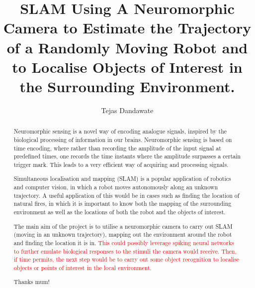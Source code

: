 \documentclass[a4paper, twoside]{report}
\title{SLAM Using A Neuromorphic Camera to Estimate the Trajectory of a Randomly Moving Robot and to Localise Objects of Interest in the Surrounding Environment.}
\author{Tejas Dandawate}
\begin{document}


\begin{abstract}
Neuromorphic sensing is a novel way of encoding analogue signals, inspired by the biological processing of information in our brains. Neuromorphic sensing is based on time encoding, where rather than recording the amplitude of the input signal at predefined times, one records the time instants where the amplitude surpasses a certain trigger mark. This leads to a very efficient way of acquiring and processing signals.

Simultaneous localisation and mapping (SLAM) is a popular application of robotics and computer vision, in which a robot moves autonomously along an unknown trajectory. A useful application of this would be in cases such as  finding the location of natural fires, in which it is important to know both the mapping of the surrounding environment as well as the locations of both the robot and the objects of interest. 

The main aim of the project is to utilise a neuromorphic camera to carry out SLAM (moving in an unknown trajectory), mapping out the environment around the robot and finding the location it is in. \textcolor{red}{This could possibly leverage spiking neural networks to further emulate biological responses to the stimuli the camera would receive. 
Then, if time permits, the next step would be to carry out some object recognition to localise objects or points of interest in the local environment.}
\end{abstract}

\renewcommand{\abstractname}{Acknowledgements}
\begin{abstract}
Thanks mum!
\end{abstract}

\tableofcontents
\listoffigures
\listoftables




% 










\end{document}
